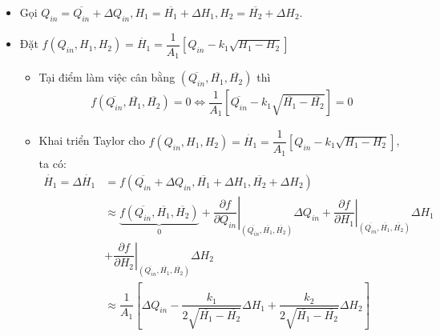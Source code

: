 \begin{enumerate}[\it a.]
\begin{itemize}
                    \item Gọi $Q_{in} = \overline{Q_{in}} + \Delta Q_{in}, H_1 = \overline{H_1} + \Delta H_1, H_2 = \overline{H_2} + \Delta H_2$.

                    \item Đặt $f\left({Q_{in}, H_1, H_2}\right) = \dot{H_1} = \dfrac{1}{A_1} \left[{Q_{in} - k_1 \sqrt{H_1 - H_2}}\right]$
                        \begin{itemize}
                            \item Tại điểm làm việc cân bằng $\left({\overline{Q_{in}}, \overline{H_1}, \overline{H_2}}\right)$ thì
                                \begin{align}
                                    f\left({\overline{Q_{in}}, \overline{H_1}, \overline{H_2}}\right) = 0 \Longleftrightarrow \dfrac{1}{A_1} \left[{\overline{Q_{in}} - k_1 \sqrt{\overline{H_1} - \overline{H_2}}}\right] = 0
                                \end{align}

                            \item Khai triển Taylor cho $f\left({Q_{in}, H_1, H_2}\right) = \dot{H_1} = \dfrac{1}{A_1} \left[{Q_{in} - k_1 \sqrt{H_1 - H_2}}\right]$, ta có:
                                \begin{align}
                                    \dot{H_1} = \Delta \dot{H_1} & = f\left({\overline{Q_{in}} + \Delta Q_{in}, \overline{H_1} + \Delta H_1, \overline{H_2} + \Delta H_2}\right) \\
                                    & \approx \underbrace{f\left({\overline{Q_{in}}, \overline{H_1}, \overline{H_2}}\right)}_{0} + \left.\dfrac{\partial f}{\partial Q_{in}}\right|_{\left({\overline{Q_{in}}, \overline{H_1}, \overline{H_2}}\right)} \Delta Q_{in} + \left.\dfrac{\partial f}{\partial H_1}\right|_{\left({\overline{Q_{in}}, \overline{H_1}, \overline{H_2}}\right)} \Delta H_1 \nonumber\\
                                    & + \left.\dfrac{\partial f}{\partial H_2}\right|_{\left({\overline{Q_{in}}, \overline{H_1}, \overline{H_2}}\right)} \Delta H_2\\
                                    & \approx \dfrac{1}{A_1} \left[{\Delta Q_{in} - \dfrac{k_1}{2\sqrt{\overline{H_1} - \overline{H_2}}} \Delta H_1 + \dfrac{k_2}{2\sqrt{\overline{H_1} - \overline{H_2}}} \Delta H_2}\right]
                                \end{align}


\end{itemize}
\end{itemize}
\end{enumerate}
